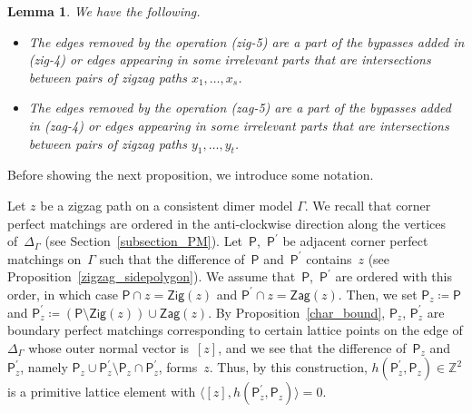 \documentclass[11pt]{article}
\numberwithin{equation}{section}
\numberwithin{equation}{section}
\numberwithin{figure}{section}
\numberwithin{table}{section}
\newtheorem{Lemma}[Theorem]{Lemma}
\newcommand{\ZZ}{\mathbb{Z}}
\newcommand{\sfP}{\mathsf{P}}
\newcommand{\Zig}{\mathsf{Zig}}
\newcommand{\Zag}{\mathsf{Zag}}
\begin{document}
\begin{Lemma}\label{bypass_removable}
We have the following.
\begin{itemize}\itemsep=0pt
\item[\rm (1)] The edges removed by the operation {\rm(zig-5)} are a part of the bypasses added in {\rm(zig-4)} or edges appearing in some irrelevant parts that are intersections between pairs of zigzag paths $x_1,\dots,x_s$.
\item[\rm (2)] The edges removed by the operation {\rm(zag-5)} are a part of the bypasses added in {\rm(zag-4)} or edges appearing in some irrelevant parts that are intersections between pairs of zigzag paths $y_1,\dots,y_t$.
\end{itemize}
\end{Lemma}

Before showing the next proposition, we introduce some notation.

\begin{setting}\label{setting_PMs_z}
Let $z$ be a zigzag path on a consistent dimer model $\Gamma$.
We recall that corner perfect matchings are ordered in the anti-clockwise direction along the vertices of~$\Delta_\Gamma$ (see Section~\ref{subsection_PM}).
Let~$\sfP$,~$\sfP^\prime$ be adjacent corner perfect matchings on~$\Gamma$ such that the difference of~$\sfP$ and~$\sfP^\prime$ contains~$z$ (see Proposition~\ref{zigzag_sidepolygon}).
We assume that~$\sfP$,~$\sfP^\prime$ are ordered with this order, in which case $\sfP\cap z=\Zig(z)$ and $\sfP^\prime\cap z=\Zag(z)$.
Then, we set $\sfP_z\coloneqq \sfP$ and $\sfP^\prime_z\coloneqq (\sfP{\setminus}\Zig(z))\cup\Zag(z)$.
By Proposition~\ref{char_bound}, $\sfP_z$, $\sfP^\prime_z$ are boundary perfect matchings corresponding to certain lattice points on the edge of $\Delta_\Gamma$ whose outer normal vector is~$[z]$,
and we see that the difference of~$\sfP_z$ and~$\sfP^\prime_z$, namely $\sfP_z\cup\sfP^\prime_z{\setminus}\sfP_z\cap\sfP^\prime_z$, forms~$z$.
Thus, by this construction, $h(\sfP^\prime_z,\sfP_z)\in\ZZ^2$ is a primitive lattice element with $\langle[z],h(\sfP^\prime_z,\sfP_z)\rangle=0$.
\end{setting}
\end{document}
